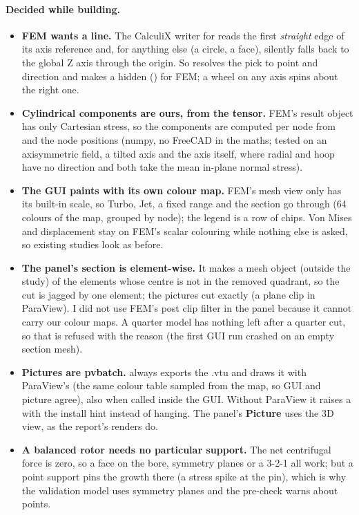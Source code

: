 \paragraph{Decided while building.}
\begin{itemize}[nosep]
  \item \textbf{FEM wants a line.} The CalculiX writer for  reads the first \emph{straight} edge of
        its axis reference and, for anything else (a circle, a face), silently falls back to the global Z axis through the
        origin. So  resolves the pick to point and direction and makes a hidden 
        () for FEM; a wheel on any axis spins about the right one.
  \item \textbf{Cylindrical components are ours, from the tensor.} FEM's result object has only Cartesian stress, so the
        components are computed per node from  and the node positions (numpy, no FreeCAD in the
        maths; tested on an axisymmetric field, a tilted axis and the axis itself, where radial and hoop have no
        direction and both take the mean in-plane normal stress).
  \item \textbf{The GUI paints with its own colour map.} FEM's mesh view only has its built-in scale, so Turbo, Jet, a
        fixed range and the section go through  (64 colours of the map, grouped by node); the legend is a row
        of chips. Von Mises and displacement stay on FEM's scalar colouring while nothing else is asked, so existing
        studies look as before.
  \item \textbf{The panel's section is element-wise.} It makes a mesh object (outside the study) of the elements whose centre
        is not in the removed quadrant, so the cut is jagged by one element; the pictures cut exactly (a plane clip in
        ParaView). I did not use FEM's post clip filter in the panel because it cannot carry our colour maps. A quarter model has nothing left after a
        quarter cut, so that is refused with the reason (the first GUI run crashed on an empty section mesh).
  \item \textbf{Pictures are pvbatch.}  always exports the .vtu and draws it with ParaView's 
        (the same colour table sampled from the map, so GUI and picture agree), also when called inside the GUI. Without
        ParaView it raises a  with the install hint instead of hanging. The panel's \textbf{Picture} uses
        the 3D view, as the report's renders do.
  \item \textbf{A balanced rotor needs no particular support.} The net centrifugal force is zero, so a face on the bore, symmetry
        planes or a 3-2-1 all work; but a point support pins the growth there (a stress spike at the pin), which is why the
        validation model uses symmetry planes and the pre-check warns about points.
\end{itemize}

